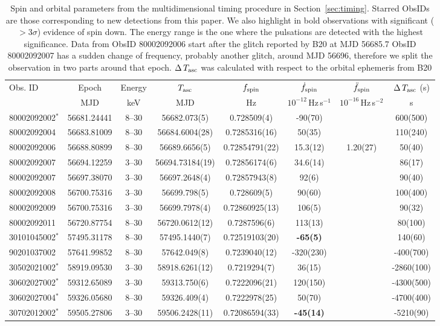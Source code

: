 \documentclass[twocolumn]{aastex631}
\newcommand{\secref}{Section~\ref}
\begin{document}
\begin{table*}[ht]
    \centering
    \begin{tabular}{l c c c c c c c}
\hline
\hline
Obs. ID & Epoch & Energy & $T_{\rm asc}$ & $f_{\rm spin}$ & $\dot{f}_{\rm spin}$ & $\ddot{f}_{\rm spin}$ & $\Delta\,T_{\rm asc}$ (s) \\
 & MJD & keV & MJD & Hz& $10^{-12}$\,Hz\,s$^{-1}$ & $10^{-16}$\,Hz\,s$^{-2}$ & s \\
\hline
80002092002$^{*}$ & 56681.24441 &8--30 & 56682.073(5)  & 0.728509(4)  & -90(70) &  & 600(500)  \\
80002092004 & 56683.81009 &8--30 & 56684.6004(28)  & 0.7285316(16)  & 50(35)  &  & 110(240)  \\
80002092006 & 56688.80899 &8--30 & 56689.6656(5)  & 0.72854791(22)  & 15.3(12)  & 1.20(27)  & 50(40)  \\
80002092007 & 56694.12259 &3--30 & 56694.73184(19)  & 0.72856174(6)  & 34.6(14)  &  & 86(17)  \\
80002092007 & 56697.38070 &3--30 & 56697.2648(4)  & 0.72857943(8)  & 92(6)  &  & 90(40)  \\
80002092008 & 56700.75316 &3--30 & 56699.798(5)  & 0.728609(5)  & 90(60)  &  & 100(400)  \\
80002092009 & 56700.75316 &3--30 & 56699.7978(4)  & 0.72860925(13)  & 106(5)  &  & 90(32)  \\
80002092011 & 56720.87754 &8--30 & 56720.0612(12)  & 0.7287596(6)  & 113(13)  &  & 80(100)  \\
30101045002$^{*}$ & 57495.31178 &8--30 & 57495.1440(7)  & 0.72519103(20)  & \textbf{-65(5) } &  & 140(60)  \\
90201037002 & 57641.99852 &8--30 & 57642.049(8)  & 0.7239040(12)  & -320(230) &  & -400(700)  \\
30502021002$^{*}$ & 58919.09530 &3--30 & 58918.6261(12)  & 0.7219294(7)  & 36(15)  &  & -2860(100)  \\
30602027002$^{*}$ & 59312.65089 &3--30 & 59313.750(6)  & 0.7222096(21)  & 120(150)  &  & -4300(500)  \\
30602027004$^{*}$ & 59326.05680 &8--30 & 59326.409(4)  & 0.7222978(25)  & 50(70)  &  & -4700(400)  \\
30702012002$^{*}$ & 59505.27806 &3--30 & 59506.2428(11)  & 0.72086594(33)  & \textbf{-45(14) } &  & -5210(90)  \\
\hline
    \end{tabular}
    \caption{Spin and orbital parameters from the multidimensional timing procedure in \secref{sec:timing}.
    Starred ObsIDs are those corresponding to new detections from this paper.
    We also highlight in bold observations with significant ($>3\sigma$) evidence of spin down.
    The energy range is the one where the pulsations are detected with the highest significance.
    Data from ObsID 80002092006 start after the glitch reported by B20 at MJD 56685.7
    ObsID 80002092007 has a sudden change of frequency, probably another glitch, around MJD 56696, therefore we split the observation in two parts around that epoch.
    $\Delta\,T_{\rm asc}$ was calculated with respect to the orbital ephemeris from B20}
    \label{tab:obs}
\end{table*}
\end{document}
